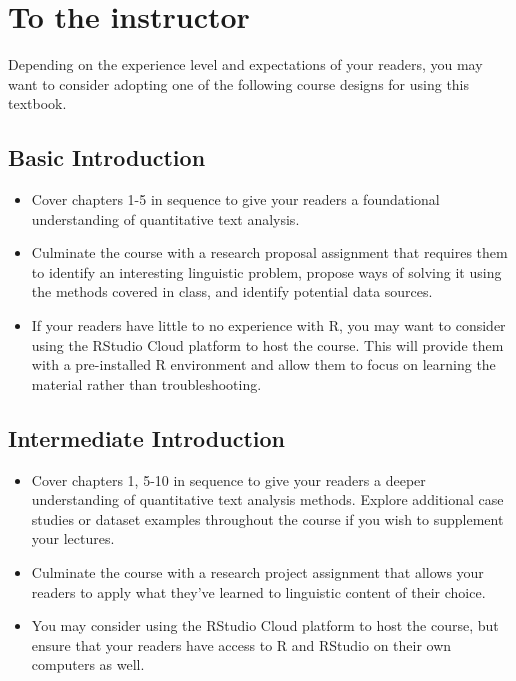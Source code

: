 \documentclass[
  letterpaper,
]{latex/krantz}
\providecommand{\tightlist}{%
  \setlength{\itemsep}{0pt}\setlength{\parskip}{0pt}}\usepackage{longtable,booktabs,array}
\begin{document}
\hypertarget{to-the-instructor}{%
\section*{To the instructor}\label{to-the-instructor}}


Depending on the experience level and expectations of your readers, you
may want to consider adopting one of the following course designs for
using this textbook.

\hypertarget{basic-introduction}{%
\subsection*{Basic Introduction}\label{basic-introduction}}

\begin{itemize}
\tightlist
\item
  Cover chapters 1-5 in sequence to give your readers a foundational
  understanding of quantitative text analysis.
\item
  Culminate the course with a research proposal assignment that requires
  them to identify an interesting linguistic problem, propose ways of
  solving it using the methods covered in class, and identify potential
  data sources.
\item
  If your readers have little to no experience with R, you may want to
  consider using the RStudio Cloud platform to host the course. This
  will provide them with a pre-installed R environment and allow them to
  focus on learning the material rather than troubleshooting.
\end{itemize}

\hypertarget{intermediate-introduction}{%
\subsection*{Intermediate
Introduction}\label{intermediate-introduction}}

\begin{itemize}
\tightlist
\item
  Cover chapters 1, 5-10 in sequence to give your readers a deeper
  understanding of quantitative text analysis methods. Explore
  additional case studies or dataset examples throughout the course if
  you wish to supplement your lectures.
\item
  Culminate the course with a research project assignment that allows
  your readers to apply what they've learned to linguistic content of
  their choice.
\item
  You may consider using the RStudio Cloud platform to host the course,
  but ensure that your readers have access to R and RStudio on their own
  computers as well.
\end{itemize}
\end{document}
